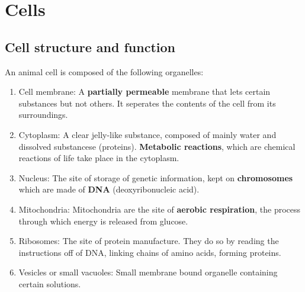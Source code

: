 \documentclass[twocolumn]{article}
\begin{document}
\section{Cells}
\subsection{Cell structure and function}
An animal cell is composed of the following organelles:
\begin{enumerate}
	\item Cell membrane: A \textbf{partially permeable} membrane that lets certain substances 
		but not others. It seperates the contents of the cell from its surroundings. 
	\item Cytoplasm: A clear jelly-like substance, composed of mainly water and dissolved
		substancese (proteins). \textbf{Metabolic reactions}, which are chemical reactions
		of life take place in the cytoplasm.
	\item Nucleus: The site of storage of genetic information, kept on 
		\textbf{chromosomes} which are made of \textbf{DNA} (deoxyribonucleic acid).
	\item Mitochondria: Mitochondria are the site of \textbf{aerobic respiration}, the 
		process through which energy is released from glucose.
	\item Ribosomes: The site of protein manufacture. They do so by reading the 
		instructions off of DNA, linking chains of amino acids, forming proteins.
	\item Vesicles or small vacuoles: Small membrane bound organelle containing certain
		solutions.
\end{enumerate}
\end{document}
